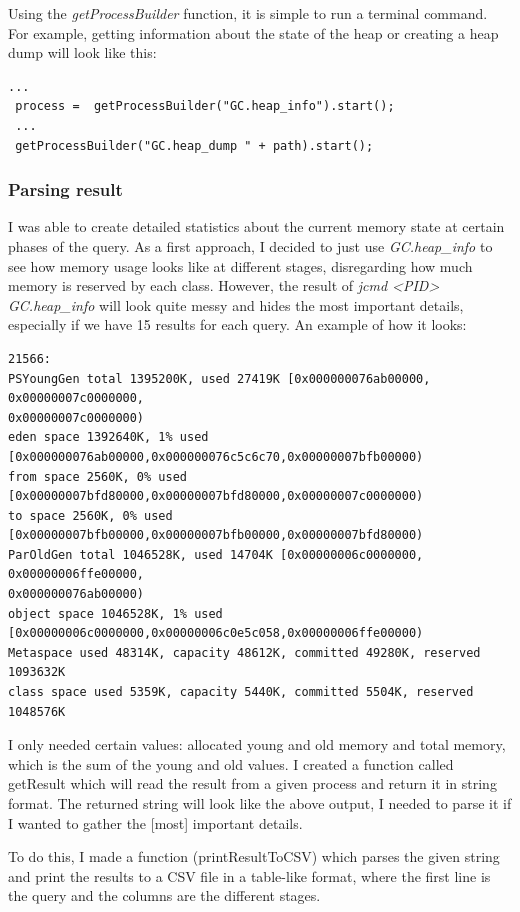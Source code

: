 Using the \textit{getProcessBuilder} function, it is simple to run a terminal command. For example, getting information about the state of the heap or creating a heap dump will look like this:

\begin{lstlisting}
...
 process =  getProcessBuilder("GC.heap_info").start();
 ...
 getProcessBuilder("GC.heap_dump " + path).start();
\end{lstlisting}

\subsubsection{Parsing result}
I was able to create detailed statistics about the current memory state at certain phases of the query. As a first approach, I decided to just use \textit{GC.heap\_info} to see how memory usage looks like at different stages, disregarding how much memory is reserved by each class. However, the result of \textit{jcmd <PID> GC.heap\_info} will look quite messy and hides the most important details, especially if we have 15 results for each query. An example of how it looks:

\begin{lstlisting}
21566:
PSYoungGen total 1395200K, used 27419K [0x000000076ab00000, 0x00000007c0000000,
0x00000007c0000000)
eden space 1392640K, 1% used
[0x000000076ab00000,0x000000076c5c6c70,0x00000007bfb00000)
from space 2560K, 0% used [0x00000007bfd80000,0x00000007bfd80000,0x00000007c0000000)
to space 2560K, 0% used [0x00000007bfb00000,0x00000007bfb00000,0x00000007bfd80000)
ParOldGen total 1046528K, used 14704K [0x00000006c0000000, 0x00000006ffe00000,
0x000000076ab00000)
object space 1046528K, 1% used
[0x00000006c0000000,0x00000006c0e5c058,0x00000006ffe00000)
Metaspace used 48314K, capacity 48612K, committed 49280K, reserved 1093632K
class space used 5359K, capacity 5440K, committed 5504K, reserved 1048576K
\end{lstlisting}

I only needed certain values: allocated young and old memory and total memory, which is the sum of the young and old values. I created a function called getResult which will read the result from a given process and return it in string format. The returned string will look like the above output, I needed to parse it if I wanted to gather the [most] important details.

To do this, I made a function (printResultToCSV) which parses the given string and print the results to a CSV file in a table-like format, where the first line is the query and the columns are the different stages.

